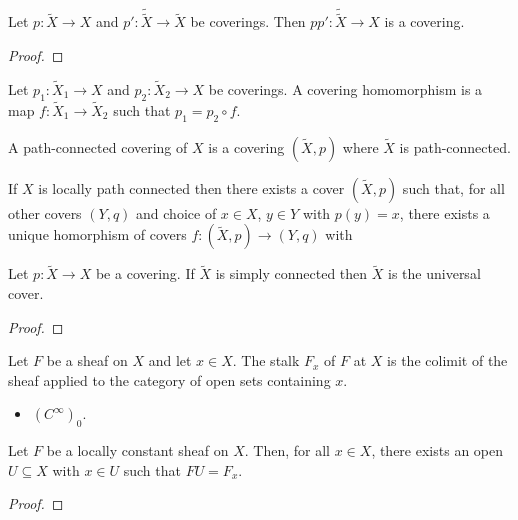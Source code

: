 \documentclass{article}
\begin{document}
\begin{proposition}
  Let $p:\tilde X\to X$ and $p':\tilde{\tilde X}\to\tilde X$ be coverings.
  Then $pp':\tilde{\tilde{X}}\to X$ is a covering.
  \begin{proof}
    \missingproof
  \end{proof}
\end{proposition}

\begin{definition}
  Let $p_1:\tilde X_1\to X$ and $p_2:\tilde X_2\to X$ be coverings. A covering homomorphism
  is a map $f:\tilde X_1\to\tilde X_2$ such that $p_1 = p_2\circ f$.
\end{definition}

\begin{definition}
  A path-connected covering of $X$ is a covering $(\tilde X,p)$ where $\tilde X$ is
  path-connected.
\end{definition}

\begin{theorem}
  If $X$ is locally path connected then there exists a cover
  $(\tilde X,p)$ such that, for all other covers $(Y,q)$ and choice of $x\in X$, $y\in Y$
  with $p(y)=x$, there exists a unique homorphism of covers $f:(\tilde X,p)\to(Y,q)$
  with \missingdef
\end{theorem}

\begin{theorem}
  Let $p:\tilde X\to X$ be a covering. If $\tilde X$ is simply connected then
  $\tilde X$ is the universal cover.
  \begin{proof}
    \missingproof
  \end{proof}
\end{theorem}

\begin{definition}
  Let $F$ be a sheaf on $X$ and let $x\in X$. The stalk $F_x$ of $F$ at $X$ is the
  colimit of the sheaf applied to the category of open sets containing $x$.
\end{definition}

\begin{example}
  \begin{itemize}
  \item $(C^\infty)_0$.
  \end{itemize}
\end{example}

\begin{lemma}
  Let $F$ be a locally constant sheaf on $X$. Then, for all $x\in X$, there exists
  an open $U\subseteq X$ with $x\in U$ such that $FU=F_x$.
  \begin{proof}
    \missingproof
  \end{proof}
\end{lemma}
\end{document}
